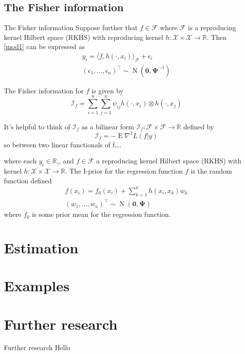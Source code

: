 \documentclass[,aspectratio=43]{beamer}
\newcommand{\bzero}{{\bm 0}}
\newcommand{\bPsi}{{\bm\Psi}}
\DeclareMathOperator{\E}{E}
\DeclareMathOperator{\N}{N}
\newcommand{\bbR}{\mathbb{R}}
\newcommand{\cF}{{\mathcal F}}
\newcommand{\cI}{{\mathcal I}}
\newcommand{\cX}{{\mathcal X}}
\begin{document}
\hypertarget{the-fisher-information}{%
\subsection{The Fisher information}\label{the-fisher-information}}

\begin{frame}{The Fisher information}
Suppose further that \(f\in\cF\) where \(\cF\) is a reproducing kernel
Hilbert space (RKHS) with reproducing kernel \(h:\cX\times\cX\to\bbR\).
Then \eqref{mod1} can be expressed as \begin{equation}\label{mod2}
\begin{gathered}
y_i = \big\langle f, h(\cdot,x_i)\big\rangle_\cF + \epsilon_i \\
(\epsilon_1,\dots,\epsilon_n)^\top \sim \N(\bzero, \bPsi^{-1})
\end{gathered}
\end{equation}

The Fisher information for \(f\) is given by \[
\cI_f = \sum_{i=1}^n\sum_{j=1}^n \psi_{ij}h(\cdot,x_i) \otimes h(\cdot,x_j)
\]

It's helpful to think of \(\cI_f\) as a bilinear form
\(\cI_f:\cF \times \cF \to \bbR\) defined by \[
\cI_f = -\E\nabla^2 L(f|y)
\] so between two linear functionals of f\ldots.
\end{frame}

\begin{frame}{}
\protect\hypertarget{section}{}
where each \(y_i\in\bbR\),, and \(f\in\cF\) a reproducing kernel Hilbert
space (RKHS) with kernel \(h:\cX\times\cX\to\bbR\). The I-prior
\autocite{bergsma2019} for the regression function \(f\) is the random
function defined \begin{equation}
\begin{gathered}
f(x_i) = f_0(x_i) + \sum_{k=1}^n h(x_i,x_k)w_k \\
(w_1,\dots,w_n)^\top \sim \N(\bzero, \bPsi)
\end{gathered}
\end{equation} where \(f_0\) is some prior mean for the regression
function.
\end{frame}

\hypertarget{estimation}{%
\section{Estimation}\label{estimation}}

\hypertarget{examples}{%
\section{Examples}\label{examples}}

\hypertarget{further-research}{%
\section{Further research}\label{further-research}}

\begin{frame}{Further research}
Hello
\end{frame}
\end{document}
